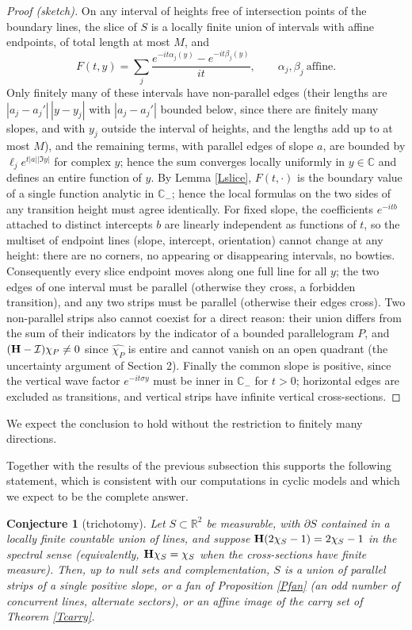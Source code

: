 \documentclass{article}
\newtheorem{conjecture}{Conjecture}
\def\H{{\bf H}}
\def\R{{\mathbb R}}
\def\C{{\mathbb C}}
\begin{document}
	\begin{proof}[Proof (sketch)]
		On any interval of heights free of intersection points of the boundary lines, the slice of $S$ is a locally finite union of intervals with affine endpoints, of total length at most $M$, and
		$$F(t,y)=\sum_j\frac{e^{-it\alpha_j(y)}-e^{-it\beta_j(y)}}{it},\qquad \alpha_j,\beta_j\ \text{affine}.$$
		Only finitely many of these intervals have non-parallel edges (their lengths are $|a_j-a_j'|\,|y-y_j|$ with $|a_j-a_j'|$ bounded below, since there are finitely many slopes, and with $y_j$ outside the interval of heights, and the lengths add up to at most $M$), and the remaining terms, with parallel edges of slope $a$, are bounded by $\ell_j e^{t|a||\Im y|}$ for complex $y$; hence the sum converges locally uniformly in $y\in\C$ and defines an entire function of $y$. By Lemma \ref{Lslice}, $F(t,\cdot)$ is the boundary value of a single function analytic in $\C_-$; hence the local formulas on the two sides of any transition height must agree identically. For fixed slope, the coefficients $e^{-itb}$ attached to distinct intercepts $b$ are linearly independent as functions of $t$, so the multiset of endpoint lines (slope, intercept, orientation) cannot change at any height: there are no corners, no appearing or disappearing intervals, no bowties. Consequently every slice endpoint moves along one full line for all $y$; the two edges of one interval must be parallel (otherwise they cross, a forbidden transition), and any two strips must be parallel (otherwise their edges cross). Two non-parallel strips also cannot coexist for a direct reason: their union differs from the sum of their indicators by the indicator of a bounded parallelogram $P$, and $(\H-\mathcal I)\chi_P\neq 0$ since $\widehat{\chi_P}$ is entire and cannot vanish on an open quadrant (the uncertainty argument of Section 2). Finally the common slope is positive, since the vertical wave factor $e^{-it\sigma y}$ must be inner in $\C_-$ for $t>0$; horizontal edges are excluded as transitions, and vertical strips have infinite vertical cross-sections.
	\end{proof}

	We expect the conclusion to hold without the restriction to finitely many directions.

	Together with the results of the previous subsection this supports the following statement, which is consistent with our computations in cyclic models and which we expect to be the complete answer.

	\begin{conjecture}[trichotomy]\label{Cdich}
		Let $S\subset\R^2$ be measurable, with $\partial S$ contained in a locally finite countable union of lines, and suppose $\H(2\chi_S-1)=2\chi_S-1$ in the spectral sense (equivalently, $\H\chi_S=\chi_S$ when the cross-sections have finite measure). Then, up to null sets and complementation, $S$ is a union of parallel strips of a single positive slope, or a fan of Proposition \ref{Pfan} (an odd number of concurrent lines, alternate sectors), or an affine image of the carry set of Theorem \ref{Tcarry}.
	\end{conjecture}
\end{document}
